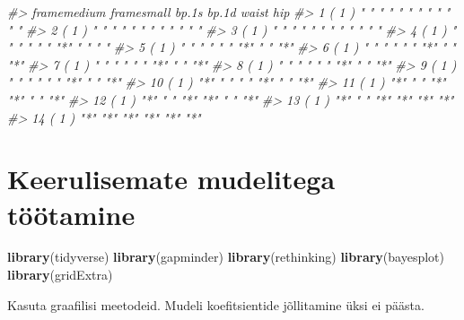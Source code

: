 \documentclass[]{book}
\newenvironment{Shaded}{\begin{snugshade}}{\end{snugshade}}
\newcommand{\CommentTok}[1]{\textcolor[rgb]{0.56,0.35,0.01}{\textit{#1}}}
\newcommand{\DataTypeTok}[1]{\textcolor[rgb]{0.13,0.29,0.53}{#1}}
\newcommand{\DecValTok}[1]{\textcolor[rgb]{0.00,0.00,0.81}{#1}}
\newcommand{\KeywordTok}[1]{\textcolor[rgb]{0.13,0.29,0.53}{\textbf{#1}}}
\newcommand{\NormalTok}[1]{#1}
\newcommand{\OperatorTok}[1]{\textcolor[rgb]{0.81,0.36,0.00}{\textbf{#1}}}
\newcommand{\StringTok}[1]{\textcolor[rgb]{0.31,0.60,0.02}{#1}}
\begin{document}
\begin{Shaded}
\begin{Highlighting}[]
\CommentTok{#>           framemedium framesmall bp.1s bp.1d waist hip}
\CommentTok{#> 1  ( 1 )  " "         " "        " "   " "   " "   " "}
\CommentTok{#> 2  ( 1 )  " "         " "        " "   " "   " "   " "}
\CommentTok{#> 3  ( 1 )  " "         " "        " "   " "   " "   " "}
\CommentTok{#> 4  ( 1 )  " "         " "        " "   "*"   " "   " "}
\CommentTok{#> 5  ( 1 )  " "         " "        " "   "*"   " "   "*"}
\CommentTok{#> 6  ( 1 )  " "         " "        " "   "*"   " "   "*"}
\CommentTok{#> 7  ( 1 )  " "         " "        " "   "*"   " "   "*"}
\CommentTok{#> 8  ( 1 )  " "         " "        " "   "*"   " "   "*"}
\CommentTok{#> 9  ( 1 )  " "         " "        " "   "*"   " "   "*"}
\CommentTok{#> 10  ( 1 ) "*"         " "        " "   "*"   " "   "*"}
\CommentTok{#> 11  ( 1 ) "*"         " "        "*"   "*"   " "   "*"}
\CommentTok{#> 12  ( 1 ) "*"         " "        "*"   "*"   " "   "*"}
\CommentTok{#> 13  ( 1 ) "*"         " "        "*"   "*"   "*"   "*"}
\CommentTok{#> 14  ( 1 ) "*"         "*"        "*"   "*"   "*"   "*"}
\end{Highlighting}
\end{Shaded}

\hypertarget{keerulisemate-mudelitega-tootamine}{%
\chapter{Keerulisemate mudelitega töötamine}\label{keerulisemate-mudelitega-tootamine}}

\begin{Shaded}
\begin{Highlighting}[]
\KeywordTok{library}\NormalTok{(tidyverse)}
\KeywordTok{library}\NormalTok{(gapminder)}
\KeywordTok{library}\NormalTok{(rethinking)}
\KeywordTok{library}\NormalTok{(bayesplot)}
\KeywordTok{library}\NormalTok{(gridExtra)}
\end{Highlighting}
\end{Shaded}

Kasuta graafilisi meetodeid.
Mudeli koefitsientide jõllitamine üksi ei päästa.

\begin{Shaded}
\end{Shaded}
\end{document}
